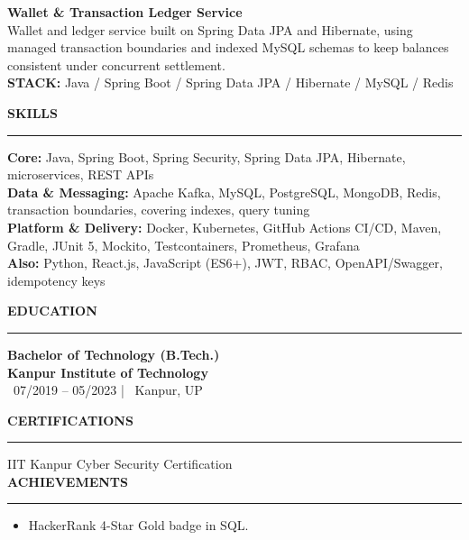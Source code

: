 \documentclass[10pt]{article}
\newcommand{\resumesection}[1]{%
  \vspace{6pt}%
  {\fontfamily{phv}\selectfont\textbf{\large\MakeUppercase{#1}}}%
  \vspace{2pt}%
  \hrule%
  \vspace{4pt}%
}
\begin{document}
\vspace{4pt}
{\textbf{Wallet \& Transaction Ledger Service}} \\
{\small Wallet and ledger service built on Spring Data JPA and Hibernate, using managed transaction boundaries and indexed MySQL schemas to keep balances consistent under concurrent settlement.} \\
{\footnotesize\textbf{STACK:} Java / Spring Boot / Spring Data JPA / Hibernate / MySQL / Redis}

\resumesection{Skills}
\textbf{Core:} Java, Spring Boot, Spring Security, Spring Data JPA, Hibernate, microservices, REST APIs \\
\textbf{Data \& Messaging:} Apache Kafka, MySQL, PostgreSQL, MongoDB, Redis, transaction boundaries, covering indexes, query tuning \\
\textbf{Platform \& Delivery:} Docker, Kubernetes, GitHub Actions CI/CD, Maven, Gradle, JUnit 5, Mockito, Testcontainers, Prometheus, Grafana \\
\textbf{Also:} Python, React.js, JavaScript (ES6+), JWT, RBAC, OpenAPI/Swagger, idempotency keys

\resumesection{Education}
{\textbf{Bachelor of Technology (B.Tech.)}} \\
{\textbf{\textcolor{primaryblue}{Kanpur Institute of Technology}}} \\
{\footnotesize\textcolor{primaryblue}{\faCalendar*}~07/2019 -- 05/2023 \quad | \quad \textcolor{primaryblue}{\faMapMarker*}~Kanpur, UP}

\resumesection{Certifications}
IIT Kanpur Cyber Security Certification \\


\resumesection{Achievements}
\begin{itemize}
    \item HackerRank 4-Star Gold badge in SQL.
\end{itemize}
\end{document}
